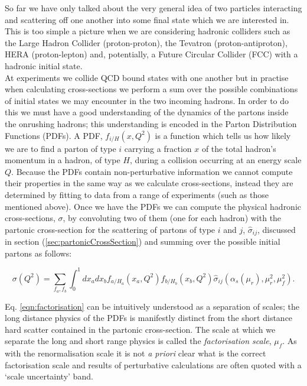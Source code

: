 	So far we have only talked about the very general idea of two particles interacting and scattering off one another into
	some final state which we are interested in.  This is too simple a picture when we are considering hadronic colliders
	such as the Large Hadron Collider (proton-proton), the Tevatron (proton-antiproton), HERA (proton-lepton) and, potentially,
	a Future Circular Collider (FCC) with a hadronic initial state.\\At experiments we collide QCD bound states with one another
	but in practise when calculating cross-sections we perform a sum over the possible combinations of initial states we may
	encounter in the two incoming hadrons.  In order to do this we must have a good understanding of the dynamics of the partons
	inside the onrushing hadrons; this understanding is encoded in the Parton Distribution Functions (PDFs).  A PDF,
	$f_{i/H}(x, Q^2)$ is a function which tells us how likely we are to find a parton of type $i$ carrying a fraction $x$ of the
	total hadron's momentum in a hadron, of type $H$, during a collision occurring at an energy scale $Q$.  Because the PDFs contain
	non-perturbative information we cannot compute their properties in the same way as we calculate cross-sections, instead they
	are determined by fitting to data from a range of experiments (such as those mentioned above).  Once we have the
	PDFs we can compute the physical hadronic cross-sections, $\sigma$, by convoluting two of them (one for each hadron) with
	the partonic cross-section for the scattering of partons of type $i$ and $j$, $\hat{\sigma}_{ij}$, discussed in section
	(\ref{sec:partonicCrossSection}) and summing over the possible initial partons as follows:

	\begin{equation}
		\sigma(Q^2) = \sum_{f_a,f_b}\int_0^1dx_adx_bf_{a/H_a}(x_a, Q^2)f_{b/H_b}(x_b, Q^2)\hat{\sigma}_{ij}(\alpha_s(\mu_r), \mu_r^2, \mu_f^2).
		\label{eqn:factorisation}
	\end{equation}

	Eq. \eqref{eqn:factorisation} can be intuitively understood as a separation of scales; the long distance physics of the PDFs is
	manifestly distinct from the short distance hard scatter contained in the partonic cross-section.  The scale at which we separate the
	long and short range physics is called the \emph{factorisation scale}, $\mu_f$.  As with the renormalisation scale it is not
	\emph{a priori} clear what is the correct factorisation scale and results of perturbative calculations are often quoted with
	a `scale uncertainty' band.

